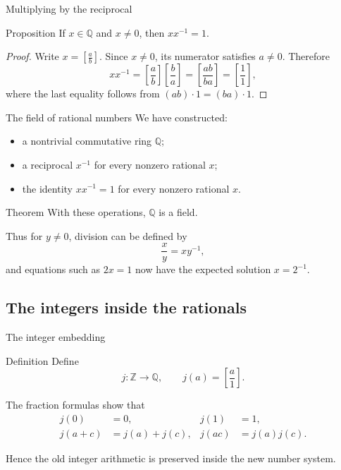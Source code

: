 \documentclass[aspectratio=169,11pt]{beamer}
\newcommand{\Z}{\mathbb Z}
\newcommand{\Q}{\mathbb Q}
\newcommand{\qcl}[2]{\left[\frac{#1}{#2}\right]}
\begin{document}
\begin{frame}{Multiplying by the reciprocal}
  \begin{block}{Proposition}
    If \(x\in\Q\) and \(x\ne0\), then \(xx^{-1}=1\).
  \end{block}

  \begin{proof}
    Write \(x=\qcl ab\).  Since \(x\ne0\), its numerator satisfies
    \(a\ne0\).  Therefore
    \[
      xx^{-1}
        =\qcl ab\qcl ba
        =\qcl{ab}{ba}
        =\qcl11,
    \]
    where the last equality follows from
    \((ab)\cdot1=(ba)\cdot1\).
  \end{proof}
\end{frame}

\begin{frame}{The field of rational numbers}
  We have constructed:
  \begin{itemize}
    \item a nontrivial commutative ring \(\Q\);
    \item a reciprocal \(x^{-1}\) for every nonzero rational \(x\);
    \item the identity \(xx^{-1}=1\) for every nonzero rational \(x\).
  \end{itemize}

  \begin{block}{Theorem}
    With these operations, \(\Q\) is a field.
  \end{block}

  Thus for \(y\ne0\), division can be defined by
  \[
    \frac{x}{y}=xy^{-1},
  \]
  and equations such as \(2x=1\) now have the expected solution
  \(x=2^{-1}\).
\end{frame}

\subsection{The integers inside the rationals}

\begin{frame}{The integer embedding}
  \begin{block}{Definition}
    Define
    \[
      j\colon\Z\longrightarrow\Q,
      \qquad
      j(a)=\qcl a1.
    \]
  \end{block}

  The fraction formulas show that
  \begin{align*}
    j(0)&=0,& j(1)&=1,\\
    j(a+c)&=j(a)+j(c),&
    j(ac)&=j(a)j(c).
  \end{align*}

  Hence the old integer arithmetic is preserved inside the new number system.
\end{frame}
\end{document}

